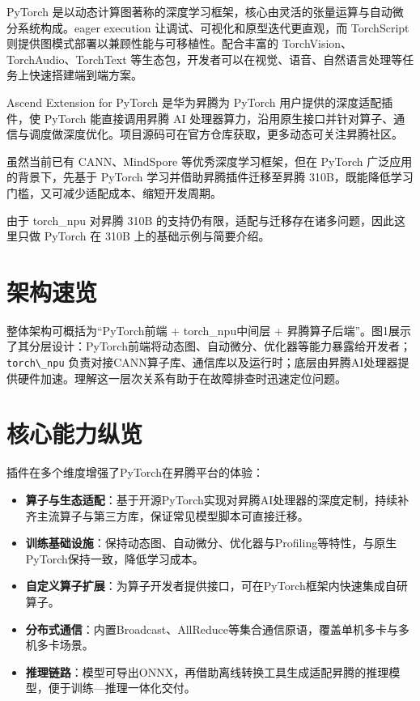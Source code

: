PyTorch
是以动态计算图著称的深度学习框架，核心由灵活的张量运算与自动微分系统构成。eager
execution 让调试、可视化和原型迭代更直观，而 TorchScript
则提供图模式部署以兼顾性能与可移植性。配合丰富的
TorchVision、TorchAudio、TorchText
等生态包，开发者可以在视觉、语音、自然语言处理等任务上快速搭建端到端方案。

Ascend Extension for PyTorch 是华为昇腾为 PyTorch
用户提供的深度适配插件，使 PyTorch 能直接调用昇腾 AI
处理器算力，沿用原生接口并针对算子、通信与调度做深度优化。项目源码可在官方仓库获取，更多动态可关注昇腾社区。

虽然当前已有 CANN、MindSpore 等优秀深度学习框架，但在 PyTorch
广泛应用的背景下，先基于 PyTorch 学习并借助昇腾插件迁移至昇腾
310B，既能降低学习门槛，又可减少适配成本、缩短开发周期。

由于 torch\_npu 对昇腾 310B
的支持仍有限，适配与迁移存在诸多问题，因此这里只做 PyTorch 在 310B
上的基础示例与简要介绍。

\section{架构速览}\label{src-book-chapter3-h1}

整体架构可概括为``PyTorch前端 + torch\_npu中间层 +
昇腾算子后端''。图1展示了其分层设计：PyTorch前端将动态图、自动微分、优化器等能力暴露给开发者；\passthrough{\lstinline!torch\_npu!}
负责对接CANN算子库、通信库以及运行时；底层由昇腾AI处理器提供硬件加速。理解这一层次关系有助于在故障排查时迅速定位问题。

\section{核心能力纵览}\label{src-book-chapter3-h2}

插件在多个维度增强了PyTorch在昇腾平台的体验：

\begin{itemize}
\tightlist
\item
  \textbf{算子与生态适配}：基于开源PyTorch实现对昇腾AI处理器的深度定制，持续补齐主流算子与第三方库，保证常见模型脚本可直接迁移。
\item
  \textbf{训练基础设施}：保持动态图、自动微分、优化器与Profiling等特性，与原生PyTorch保持一致，降低学习成本。
\item
  \textbf{自定义算子扩展}：为算子开发者提供接口，可在PyTorch框架内快速集成自研算子。
\item
  \textbf{分布式通信}：内置Broadcast、AllReduce等集合通信原语，覆盖单机多卡与多机多卡场景。
\item
  \textbf{推理链路}：模型可导出ONNX，再借助离线转换工具生成适配昇腾的推理模型，便于训练---推理一体化交付。
\end{itemize}

